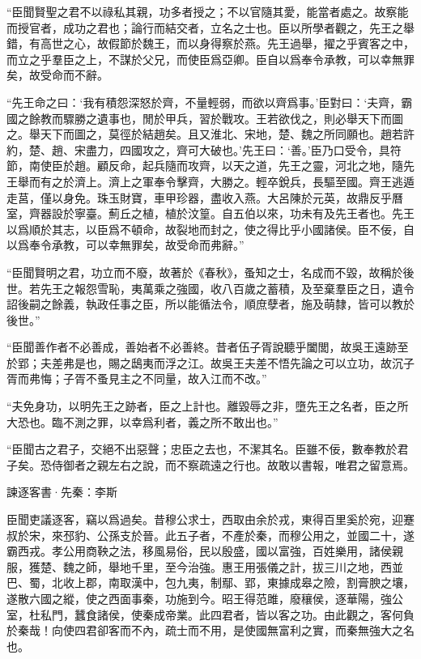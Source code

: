 \documentclass[12pt,a4paper]{ctexbook}
\begin{document}
“臣聞賢聖之君不以祿私其親，功多者授之；不以官隨其愛，能當者處之。故察能而授官者，成功之君也；論行而結交者，立名之士也。臣以所學者觀之，先王之舉錯，有高世之心，故假節於魏王，而以身得察於燕。先王過舉，擢之乎賓客之中，而立之乎羣臣之上，不謀於父兄，而使臣爲亞卿。臣自以爲奉令承教，可以幸無罪矣，故受命而不辭。\par
“先王命之曰：‘我有積怨深怒於齊，不量輕弱，而欲以齊爲事。’臣對曰：‘夫齊，霸國之餘教而驟勝之遺事也，閒於甲兵，習於戰攻。王若欲伐之，則必舉天下而圖之。舉天下而圖之，莫徑於結趙矣。且又淮北、宋地，楚、魏之所同願也。趙若許約，楚、趙、宋盡力，四國攻之，齊可大破也。’先王曰：‘善。’臣乃口受令，具符節，南使臣於趙。顧反命，起兵隨而攻齊，以天之道，先王之靈，河北之地，隨先王舉而有之於濟上。濟上之軍奉令擊齊，大勝之。輕卒銳兵，長驅至國。齊王逃遁走莒，僅以身免。珠玉財寶，車甲珍器，盡收入燕。大呂陳於元英，故鼎反乎曆室，齊器設於寧臺。薊丘之植，植於汶篁。自五伯以來，功未有及先王者也。先王以爲順於其志，以臣爲不頓命，故裂地而封之，使之得比乎小國諸侯。臣不佞，自以爲奉令承教，可以幸無罪矣，故受命而弗辭。”\par
“臣聞賢明之君，功立而不廢，故著於《春秋》，蚤知之士，名成而不毀，故稱於後世。若先王之報怨雪恥，夷萬乘之強國，收八百歲之蓄積，及至棄羣臣之日，遺令詔後嗣之餘義，執政任事之臣，所以能循法令，順庶孽者，施及萌隸，皆可以教於後世。”\par
“臣聞善作者不必善成，善始者不必善終。昔者伍子胥說聽乎闔閭，故吳王遠跡至於郢；夫差弗是也，賜之鴟夷而浮之江。故吳王夫差不悟先論之可以立功，故沉子胥而弗悔；子胥不蚤見主之不同量，故入江而不改。”\par
“夫免身功，以明先王之跡者，臣之上計也。離毀辱之非，墮先王之名者，臣之所大恐也。臨不測之罪，以幸爲利者，義之所不敢出也。”\par
“臣聞古之君子，交絕不出惡聲；忠臣之去也，不潔其名。臣雖不佞，數奉教於君子矣。恐侍御者之親左右之說，而不察疏遠之行也。故敢以書報，唯君之留意焉。\par
諫逐客書·先秦：李斯 \par
臣聞吏議逐客，竊以爲過矣。昔穆公求士，西取由余於戎，東得百里奚於宛，迎蹇叔於宋，來邳豹、公孫支於晉。此五子者，不產於秦，而穆公用之，並國二十，遂霸西戎。孝公用商鞅之法，移風易俗，民以殷盛，國以富強，百姓樂用，諸侯親服，獲楚、魏之師，舉地千里，至今治強。惠王用張儀之計，拔三川之地，西並巴、蜀，北收上郡，南取漢中，包九夷，制鄢、郢，東據成皋之險，割膏腴之壤，遂散六國之縱，使之西面事秦，功施到今。昭王得范雎，廢穰侯，逐華陽，強公室，杜私門，蠶食諸侯，使秦成帝業。此四君者，皆以客之功。由此觀之，客何負於秦哉！向使四君卻客而不內，疏士而不用，是使國無富利之實，而秦無強大之名也。\par
\end{document}

